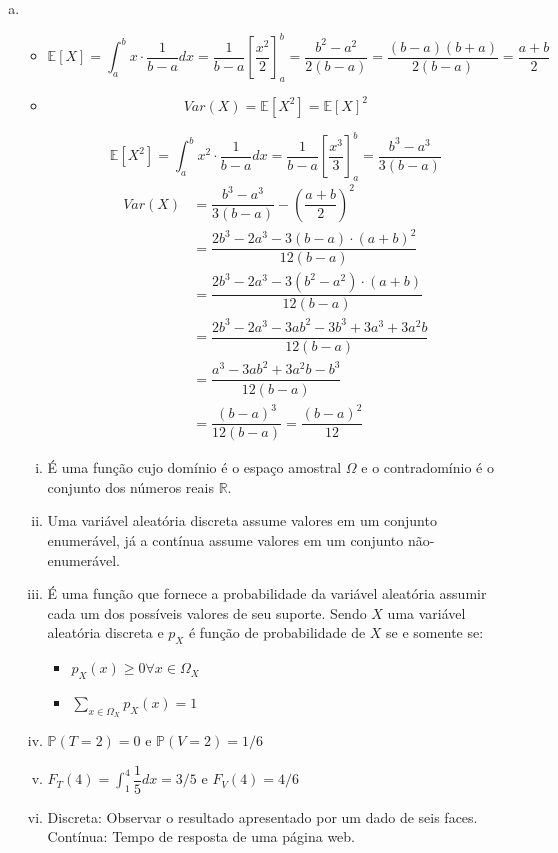 \documentclass[12pt]{article}
\begin{document}
\begin{enumerate}[a)]
    \item \begin{itemize}
        \item $$\mathbb{E}[X] = \int_{a}^{b} x\cdot \dfrac{1}{b-a} dx = \dfrac{1}{b-a}\left[ \dfrac{x^2}{2}\right]_{a}^{b} = \dfrac{b^2 - a^2}{2(b-a)} = \dfrac{(b-a)(b+a)}{2(b-a)} = \dfrac{a+b}{2}$$
        \item $$Var(X) = \mathbb{E}[X^2] = \mathbb{E}[X]^2$$
        
        $$\mathbb{E}[X^2] = \int_{a}^{b} x^2\cdot \dfrac{1}{b-a} dx = \dfrac{1}{b-a}\left[ \dfrac{x^3}{3}\right]_{a}^{b} = \dfrac{b^3 - a^3}{3(b-a)}$$
\begin{align*}
    Var(X) &= \dfrac{b^3 - a^3}{3(b-a)} -  \left(\dfrac{a+b}{2}\right)^2\\
    &= \dfrac{2b^3 - 2a^3 - 3(b-a)\cdot (a+b)^2 }{12(b-a)}\\
    &=\dfrac{2b^3 - 2a^3 - 3(b^2-a^2)\cdot (a+b) }{12(b-a)}\\
    &=\dfrac{2b^3 - 2a^3 - 3ab^2 -3b^3 +3a^3 +3a^2b }{12(b-a)}\\
    &= \dfrac{  a^3 - 3ab^2  +3a^2b -b^3}{12(b-a)}\\
    &= \dfrac{  (b-a)^3}{12(b-a)} =  \dfrac{ (b-a)^2}{12}
\end{align*}
        $$$$
    \end{itemize}

    \begin{enumerate}[i)]
        \item É uma função cujo domínio é o espaço amostral $\Omega$ e o contradomínio é o conjunto dos números reais $\mathbb{R}$.
        \item Uma variável aleatória discreta assume valores em um conjunto enumerável, já a contínua assume valores em um conjunto não-enumerável. 
        \item É uma função que fornece a probabilidade da variável aleatória assumir cada um dos possíveis valores de seu suporte. Sendo $X$ uma variável aleatória discreta e $p_X$ é função de probabilidade de $X$ se e somente se:
        \begin{itemize}
            \item $p_X(x) \geq 0 \forall x \in \Omega_X$
            \item $\sum_{x \in \Omega_X} p_X(x) = 1$
        \end{itemize}
        \item $\mathds{P}(T=2) = 0$  e $\mathds{P}(V=2) = 1/6$
        \item $F_T(4) = \displaystyle\int_{1}^{4} \dfrac{1}{5} dx = 3/5$ e $F_V(4) = 4/6$
        \item Discreta: Observar o resultado apresentado por um dado de seis faces. Contínua: Tempo de resposta de uma página web.
    \end{enumerate}
\end{enumerate}
\end{document}
